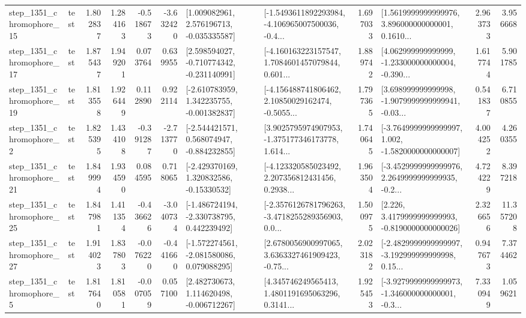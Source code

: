 \begin{tabular}{llrrrrllrlrr}
 step\_1351\_chromophore\_15 &      test &      1.802837 &    1.284163 &     -0.518673 & -3.632420 &    [1.009082961, 2.576196713, -0.035335587] &  [-1.5493611892293984, -4.106965007500036, -0.4... &       1.697033 &  [1.5619999999999976, 3.896000000000001, 0.1610... &            2.963733 &          3.956668 \\
 step\_1351\_chromophore\_17 &      test &      1.875437 &    1.949201 &      0.073764 &  0.639955 &   [2.598594027, -0.710774342, -0.231140991] &  [-4.160163223157547, 1.7084601457079844, 0.601... &       1.889742 &  [4.062999999999999, -1.233000000000004, -0.390... &            1.617744 &          5.901785 \\
 step\_1351\_chromophore\_19 &      test &      1.813558 &    1.926449 &      0.112890 &  0.922114 &   [-2.610783959, 1.342235755, -0.001382837] &  [-4.156488741806462, 2.10850029162474, -0.5055... &       1.797365 &  [3.698999999999998, -1.9079999999999941, -0.03... &            0.541837 &          6.710855 \\
  step\_1351\_chromophore\_2 &      test &      1.825395 &    1.434108 &     -0.391287 & -2.713770 &   [-2.544421571, 0.568074947, -0.884232855] &  [3.9025795974907953, -1.375177346173778, 1.614... &       1.740645 &  [-3.7649999999999997, 1.002, -1.5820000000000007] &            4.004252 &          4.260355 \\
 step\_1351\_chromophore\_21 &      test &      1.849994 &    1.934590 &      0.084595 &  0.718065 &    [-2.429370169, 1.320832586, -0.15330532] &  [-4.123320585023492, 2.207356812431456, 0.2938... &       1.963504 &  [-3.4529999999999976, 2.2649999999999935, -0.2... &            4.724229 &          8.397218 \\
 step\_1351\_chromophore\_25 &      test &      1.847981 &    1.411354 &     -0.436626 & -3.040734 &   [-1.486724194, -2.330738795, 0.442239492] &  [-2.3576126781796263, -3.4718255289356903, 0.0... &       1.500975 &   [2.226, 3.4179999999999993, -0.8190000000000026] &            2.326656 &         11.357208 \\
 step\_1351\_chromophore\_27 &      test &      1.914023 &    1.837803 &     -0.076220 & -0.441660 &   [-1.572274561, -2.081580086, 0.079088295] &  [2.6780056900997065, 3.6363327461909423, -0.75... &       2.023182 &  [-2.4829999999999997, -3.192999999999998, 0.15... &            0.947673 &          7.374462 \\
  step\_1351\_chromophore\_5 &      test &      1.817640 &    1.810581 &     -0.007059 &  0.057100 &    [2.482730673, 1.114620498, -0.006712267] &  [4.345746249565413, 1.4801191695063296, 0.3141... &       1.925453 &  [-3.9279999999999973, -1.346000000000001, -0.3... &            7.330949 &          1.059621 \\

\end{tabular}
